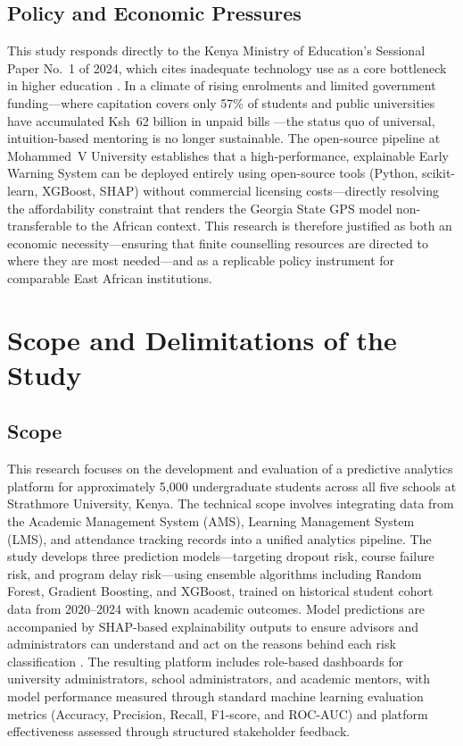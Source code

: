 \documentclass[12pt]{report}
\begin{document}
\subsection{Policy and Economic Pressures}
This study responds directly to the Kenya Ministry of Education's Sessional
Paper No.~1 of 2024, which cites inadequate technology use as a core bottleneck
in higher education \parencite{kippra2024}. In a climate of rising enrolments and
limited government funding---where capitation covers only 57\% of students and
public universities have accumulated Ksh~62 billion in unpaid bills
\parencite{dailynation2024, kippra2024}---the status quo of universal,
intuition-based mentoring is no longer sustainable. The \textcite{bettahi2025}
open-source pipeline at Mohammed~V University establishes that a
high-performance, explainable Early Warning System can be deployed entirely using
open-source tools (Python, scikit-learn, XGBoost, SHAP) without commercial
licensing costs---directly resolving the affordability constraint that renders the
Georgia State GPS model non-transferable to the African context.
This research is therefore justified as both an economic necessity---ensuring that
finite counselling resources are directed to where they are most needed---and as a
replicable policy instrument for comparable East African institutions.

\section{Scope and Delimitations of the Study}

\subsection{Scope}
This research focuses on the development and evaluation of a predictive analytics platform for approximately 5,000 undergraduate students across all five schools at Strathmore University, Kenya. The technical scope involves integrating data from the Academic Management System (AMS), Learning Management System (LMS), and attendance tracking records into a unified analytics pipeline. The study develops three prediction models---targeting dropout risk, course failure risk, and program delay risk---using ensemble algorithms including Random Forest, Gradient Boosting, and XGBoost, trained on historical student cohort data from 2020--2024 with known academic outcomes. Model predictions are accompanied by SHAP-based explainability outputs to ensure advisors and administrators can understand and act on the reasons behind each risk classification \parencite{Lundberg2017}. The resulting platform includes role-based dashboards for university administrators, school administrators, and academic mentors, with model performance measured through standard machine learning evaluation metrics (Accuracy, Precision, Recall, F1-score, and ROC-AUC) and platform effectiveness assessed through structured stakeholder feedback.
\end{document}
